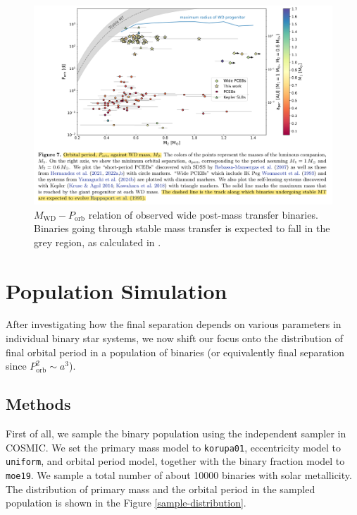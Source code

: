 \documentclass[12pt]{article}
\newcommand{\Porb}{P_{\mathrm{orb}}}
\begin{document}
\begin{figure}
    \centering
    \includegraphics[width=\linewidth]{theory-observed.png}
    \caption{$M_{\mathrm{WD}} - P_{\mathrm{orb}}$ relation of observed wide post-mass transfer binaries. Binaries going through stable mass transfer is expected to fall in the grey region, as calculated in \cite{rappaport1995relation}.}
    \label{theory-observed}
\end{figure}

\section{Population Simulation}
After investigating how the final separation depends on various parameters in individual binary star systems, we now shift our focus onto the distribution of final orbital period in a population of binaries (or equivalently final separation since $\Porb^2 \sim a^3$).

\subsection{Methods}

First of all, we sample the binary population using the independent sampler in COSMIC. We set the primary mass model to \verb|korupa01|, eccentricity model to \verb|uniform|, and orbital period model, together with the binary fraction model to \verb|moe19|. We sample a total number of about 10000 binaries with solar metallicity. The distribution of primary mass and the orbital period in the sampled population is shown in the Figure \ref{sample-distribution}.
\end{document}

